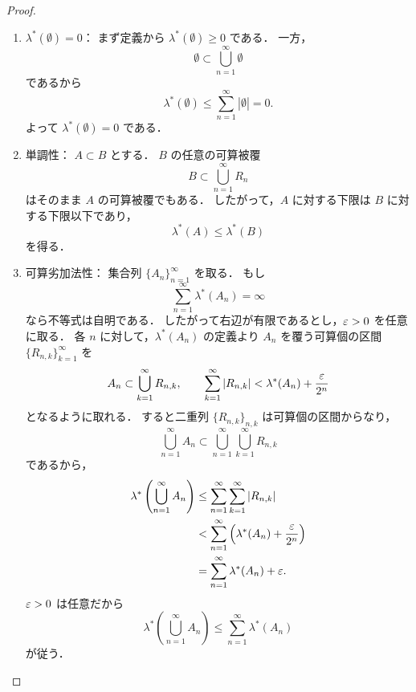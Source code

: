 \begin{proof}
\begin{enumerate}
    \item $\lambda^*(\emptyset)=0$：
    まず定義から $\lambda^*(\emptyset)\ge 0$ である．
    一方，
    \[
    \emptyset \subset \bigcup_{n=1}^{\infty}\emptyset
    \]
    であるから
    \[
    \lambda^*(\emptyset) \le \sum_{n=1}^{\infty} |\emptyset| = 0.
    \]
    よって $\lambda^*(\emptyset)=0$ である．

    \item 単調性：
    $A \subset B$ とする．
    $B$ の任意の可算被覆
    \[
    B \subset \bigcup_{n=1}^{\infty} R_n
    \]
    はそのまま $A$ の可算被覆でもある．
    したがって，$A$ に対する下限は $B$ に対する下限以下であり，
    \[
    \lambda^*(A) \le \lambda^*(B)
    \]
    を得る．

    \item 可算劣加法性：
    集合列 $\{A_n\}_{n=1}^{\infty}$ を取る．
    もし
    \[
    \sum_{n=1}^{\infty}\lambda^*(A_n)=\infty
    \]
    なら不等式は自明である．
    したがって右辺が有限であるとし，$\varepsilon > 0$ を任意に取る．
    各 $n$ に対して，$\lambda^*(A_n)$ の定義より
    $A_n$ を覆う可算個の区間 $\{R_{n,k}\}_{k=1}^{\infty}$ を
    \[
    A_n \subset \bigcup_{k=1}^{\infty} R_{n,k},
    \qquad
    \sum_{k=1}^{\infty} |R_{n,k}|
    <
    \lambda^*(A_n) + \frac{\varepsilon}{2^n}
    \]
    となるように取れる．
    すると二重列 $\{R_{n,k}\}_{n,k}$ は可算個の区間からなり，
    \[
    \bigcup_{n=1}^{\infty} A_n
    \subset
    \bigcup_{n=1}^{\infty}\bigcup_{k=1}^{\infty} R_{n,k}
    \]
    であるから，
    \begin{align*}
    \lambda^*\left(\bigcup_{n=1}^{\infty} A_n\right)
    &\le
    \sum_{n=1}^{\infty}\sum_{k=1}^{\infty} |R_{n,k}| \\
    &<
    \sum_{n=1}^{\infty}
    \left(
    \lambda^*(A_n)+\frac{\varepsilon}{2^n}
    \right) \\
    &=
    \sum_{n=1}^{\infty}\lambda^*(A_n)+\varepsilon.
    \end{align*}
    $\varepsilon > 0$ は任意だから
    \[
    \lambda^*\left(\bigcup_{n=1}^{\infty} A_n\right)
    \le
    \sum_{n=1}^{\infty}\lambda^*(A_n)
    \]
    が従う．
\end{enumerate}
\end{proof}



